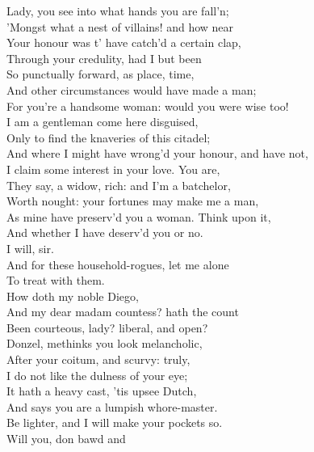 \documentclass[a4paper,oneside]{memoir}
\begin{document}
\begin{drama*}
\surlyspeaks Lady, you see into what hands you are fall'n;\\
'Mongst what a nest of villains! and how near\\
Your honour was t' have catch'd a certain clap,\\
Through your credulity, had I but been\\
So punctually forward, as place, time,\\
And other circumstances would have made a man;\\
For you're a handsome woman: would you were wise too!\\
I am a gentleman come here disguised,\\
Only to find the knaveries of this citadel;\\
And where I might have wrong'd your honour, and have not,\\
I claim some interest in your love. You are,\\
They say, a widow, rich: and I'm a batchelor,\\
Worth nought: your fortunes may make me a man,\\
As mine have preserv'd you a woman. Think upon it,\\
And whether I have deserv'd you or no.\\
\pliantspeaks I will, sir.\\
\surlyspeaks {} And for these household-rogues, let me alone\\
To treat with them.\\
\subtlespeaks {} How doth my noble Diego,\\
And my dear madam countess? hath the count\\
Been courteous, lady? liberal, and open?\\
Donzel, methinks you look melancholic,\\
After your coitum, and scurvy: truly,\\
I do not like the dulness of your eye;\\
It hath a heavy cast, 'tis upsee Dutch,\\
And says you are a lumpish whore-master.\\
Be lighter, and I will make your pockets so.\\
\surlyspeaks {} Will you, don bawd and\\

\end{drama*}
\end{document}
